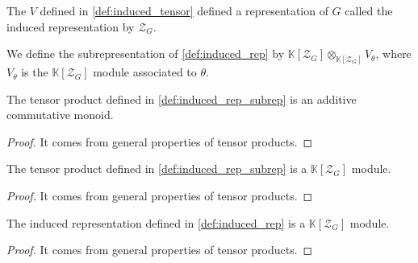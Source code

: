 \begin{definition}
    \label{def:induced_rep}
    \leanok
    The $V$ defined in \ref{def:induced_tensor} defined a representation of $G$ called the
    induced representation by $\mathcal{Z}_G$.
\end{definition}

\begin{definition}
    \label{def:induced_rep_subrep}
    \leanok
    We define the subrepresentation of \ref{def:induced_rep} by 
    $\mathbb{K}[\mathcal{Z}_G]\otimes_{\mathbb{K}[\mathcal{Z}_G]}V_\theta$,
    where $V_\theta$ is the $\mathbb{K}[\mathcal{Z}_G]$ module associated to $\theta$.
\end{definition}

\begin{proposition}
    \label{prop:subrep_addmon}
    \leanok 
   The tensor product defined in \ref{def:induced_rep_subrep} is an additive commutative monoid.
\end{proposition}
\begin{proof}
    \leanok
    It comes from general properties of tensor products.
\end{proof}

\begin{proposition}
    \label{prop:subrep_module}
    \leanok 
   The tensor product defined in \ref{def:induced_rep_subrep} is a $\mathbb{K}[\mathcal{Z}_G]$ module.
\end{proposition}
\begin{proof}
    \leanok
    It comes from general properties of tensor products.
\end{proof}


\begin{proposition}
    \label{prop:induced_rep_is_module}
    \leanok 
   The induced representation defined in \ref{def:induced_rep} is a $\mathbb{K}[\mathcal{Z}_G]$ module.
\end{proposition}
\begin{proof}
    \leanok
    It comes from general properties of tensor products.
\end{proof}


